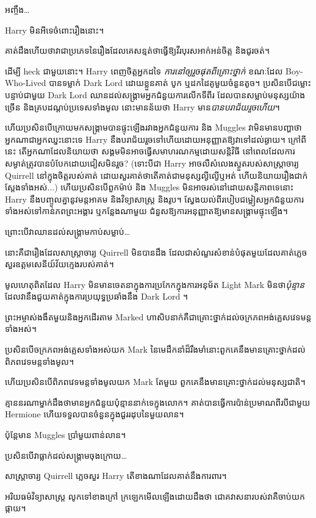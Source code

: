 អញ្ចឹង…

Harry មិនអីទេចំពោះរឿងនោះ។

គាត់ដឹងហើយថាវាជាប្រភេទនៃរឿងដែលគេសន្មត់ថាធ្វើឱ្យវីរបុរសអាក់អន់ចិត្ត និងជូរចត់។

ដើម្បី heck ជាមួយនោះ។ Harry ពេញចិត្ត​អ្នក​ដទៃ \emph{ការ​នៅ​ឲ្យ​រួច​ផុត​ពី​គ្រោះថ្នាក់} ខណៈ​ដែល Boy-Who-Lived បាន​ទម្លាក់ Dark Lord ដោយ​ខ្លួន​គាត់ បូក ឬដក​ដៃគូ​មួយចំនួន​តូច។ ប្រសិនបើជម្លោះបន្ទាប់ជាមួយ Dark Lord ឈានដល់សង្រ្គាមអ្នកជំនួយការលើកទីពីរ ដែលបានសម្លាប់មនុស្សយ៉ាងច្រើន និងគ្របដណ្តប់ប្រទេសទាំងមូល នោះមានន័យថា Harry មាន\emph{បានបរាជ័យរួចហើយ}។

ហើយប្រសិនបើក្រោយមកសង្រ្គាមបានផ្ទុះឡើងរវាងអ្នកជំនួយការ និង Muggles វាមិនមានបញ្ហាថាអ្នកណាជាអ្នកឈ្នះនោះទេ Harry នឹងបរាជ័យរួចទៅហើយដោយអនុញ្ញាតឱ្យវាទៅដល់ឆ្ងាយ។ ក្រៅពីនេះ តើអ្នកណាដែលនិយាយថា សង្គមមិនអាចធ្វើសមាហរណកម្មដោយសន្តិវិធី នៅពេលដែលការសម្ងាត់ត្រូវបានបំបែកដោយជៀសមិនរួច? (ទោះបីជា Harry អាចលឺសំលេងស្ងួតរបស់សាស្រ្តាចារ្យ Quirrell នៅក្នុងចិត្តរបស់គាត់ ដោយសួរគាត់ថាតើគាត់ជាមនុស្សល្ងីល្ងើឬអត់ ហើយនិយាយរឿងជាក់ស្តែងទាំងអស់...) ហើយប្រសិនបើពួកម៉ាប់ និង Muggles មិនអាចរស់នៅដោយសន្តិភាពទេនោះ Harry នឹងបញ្ចូលគ្នានូវមន្តអាគម និងវិទ្យាសាស្ត្រ និងរូប។ ស្វែងយល់ពីរបៀបជម្លៀសអ្នកជំនួយការទាំងអស់ទៅកាន់ភពព្រះអង្គារ ឬកន្លែងណាមួយ ជំនួសឱ្យការអនុញ្ញាតឱ្យមានសង្រ្គាមផ្ទុះឡើង។

ព្រោះ​បើ​វា​ឈាន​ដល់​សង្គ្រាម​កាប់​សម្លាប់…

នោះគឺជារឿងដែលសាស្រ្តាចារ្យ Quirrell មិនបានដឹង ដែលជាសំណួរសំខាន់បំផុតមួយដែលគាត់ភ្លេចសួរឧត្តមសេនីយ៍វ័យក្មេងរបស់គាត់។

មូលហេតុពិតដែល Harry មិនមានចេតនាក្នុងការប្រកែកក្នុងការអនុម័ត Light Mark មិនថា\emph{ប៉ុន្មាន} ដែលវានឹងជួយគាត់ក្នុងការប្រយុទ្ធប្រឆាំងនឹង Dark Lord ។

ព្រះអម្ចាស់ងងឹតមួយនិងអ្នកដើរតាម Marked ហាសិបនាក់គឺជាគ្រោះថ្នាក់ដល់ចក្រភពអង់គ្លេសវេទមន្តទាំងអស់។

ប្រសិនបើចក្រភពអង់គ្លេសទាំងអស់យក Mark នៃមេដឹកនាំដ៏រឹងមាំនោះពួកគេនឹងមានគ្រោះថ្នាក់ដល់ពិភពវេទមន្តទាំងមូល។

ហើយប្រសិនបើពិភពវេទមន្តទាំងមូលយក Mark តែមួយ ពួកគេនឹងមានគ្រោះថ្នាក់ដល់មនុស្សជាតិ។

គ្មាន​នរណា​ម្នាក់​ដឹង​ថា​មាន​អ្នក​ជំនួយ​ប៉ុន្មាន​នាក់​ទេ​ក្នុង​លោក។ គាត់បានធ្វើការប៉ាន់ប្រមាណពីរបីជាមួយ Hermione ហើយទទួលបានចំនួនក្នុងជួររដុបនៃមួយលាន។

ប៉ុន្តែមាន Muggles ប្រាំមួយពាន់លាន។

ប្រសិនបើវាធ្លាក់ដល់សង្គ្រាមចុងក្រោយ…

សាស្ត្រាចារ្យ Quirrell ភ្លេចសួរ Harry តើខាងណាដែលគាត់នឹងការពារ។

អរិយធម៌​វិទ្យាសាស្ត្រ លូក​ទៅ​ខាង​ក្រៅ ក្រឡេក​មើល​ឡើង​ដោយ​ដឹង​ថា ជោគ​វាសនា​របស់​វា​គឺ​ចាប់​យក​ផ្កាយ។

